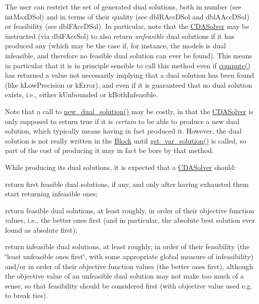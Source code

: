 The user can restrict the set of generated dual solutions, both in number (see int\+Max\+D\+Sol) and in terms of their quality (see dbl\+R\+Acc\+D\+Sol and dbl\+A\+Acc\+D\+Sol) or feasibility (see dbl\+F\+Acc\+D\+Sol). In particular, note that the \mbox{\hyperlink{class_s_m_spp__di__unipi__it_1_1_c_d_a_solver}{C\+D\+A\+Solver}} may be instructed (via dbl\+F\+Acc\+Sol) to also return {\itshape unfeasible} dual solutions if it has produced any (which may be the case if, for instance, the models is dual infeasible, and therefore no feasible dual solution can ever be found). This means in particular that it is in principle sensible to call this method even if \mbox{\hyperlink{class_s_m_spp__di__unipi__it_1_1_m_c_f_solver_afc8ff54ab05d22f4cca0fb0bfbeb7a49}{compute()}} has returned a value not necessarily implying that a dual solution has been found (like k\+Low\+Precision or k\+Error), and even if it is guaranteed that no dual solution exists, i.\+e., either k\+Unbounded or k\+Both\+Infeasible.

Note that a call to \mbox{\hyperlink{class_s_m_spp__di__unipi__it_1_1_m_c_f_solver_aa78ff49c515c8c6e2da6216d104dc219}{new\+\_\+dual\+\_\+solution()}} may be costly, in that the \mbox{\hyperlink{class_s_m_spp__di__unipi__it_1_1_c_d_a_solver}{C\+D\+A\+Solver}} is only supposed to return true if it is {\itshape certain} to be able to produce a new dual solution, which typically means having in fact produced it. However, the dual solution is not really written in the \mbox{\hyperlink{class_s_m_spp__di__unipi__it_1_1_block}{Block}} until \mbox{\hyperlink{class_s_m_spp__di__unipi__it_1_1_m_c_f_solver_ac83fa9679882440d13fb5940494699c5}{get\+\_\+var\+\_\+solution()}} is called, so part of the cost of producing it may in fact be bore by that method.

While producing its dual solutions, it is expected that a \mbox{\hyperlink{class_s_m_spp__di__unipi__it_1_1_c_d_a_solver}{C\+D\+A\+Solver}} should\+:


\begin{DoxyItemize}
\item return first feasible dual solutions, if any, and only after having exhausted them start returning infeasible ones;
\item return feasible dual solutions, at least roughly, in order of their objective function values, i.\+e., the better ones first (and in particular, the absolute best solution ever found as absolute first);
\item return infeasible dual solutions, at least roughly, in order of their feasibility (the \char`\"{}least unfeasible ones first\char`\"{}, with some appropriate global measure of infeasibility) and/or in order of their objective function values (the better ones first), although the objective value of an unfeasible dual solution may not make too much of a sense, so that feasibility should be considered first (with objective value used e.\+g. to break ties).
\end{DoxyItemize}

